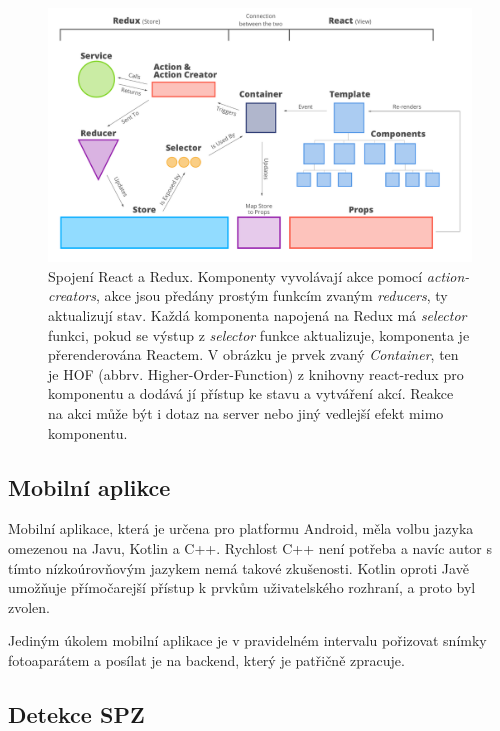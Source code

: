 \begin{figure}[!htb] \centering
\includegraphics[width=145mm]{../img/react-redux-architecture.png}
\caption[Spojení React a Redux.]{Spojení React a Redux. \citep[][]{react_redux_dataflow}
Komponenty vyvolávají akce pomocí \textit{action-creators}, akce jsou předány prostým funkcím zvaným \textit{reducers},
ty aktualizují stav. Každá komponenta napojená
na Redux má \textit{selector} funkci, pokud se výstup z \textit{selector} funkce aktualizuje, komponenta je přerenderována Reactem.
V obrázku je prvek zvaný \textit{Container}, ten je HOF (abbrv. Higher-Order-Function) z knihovny react-redux
pro komponentu a dodává jí přístup ke stavu a vytváření akcí.
Reakce na akci může být i dotaz na server nebo jiný vedlejší efekt mimo komponentu.}
\label{fig:react_redux_dataflow}
\end{figure}

\subsection{Mobilní aplikce} \label{mobile_app}

\noindent
Mobilní aplikace, která je určena pro platformu Android, měla volbu jazyka omezenou na Javu, Kotlin a C++.
Rychlost C++ není potřeba a navíc autor s tímto nízkoúrovňovým jazykem nemá takové zkušenosti.
Kotlin oproti Javě umožňuje přímočarejší přístup k prvkům uživatelského rozhraní, a proto byl zvolen.

Jediným úkolem mobilní aplikace je v pravidelném intervalu pořizovat snímky fotoaparátem a posílat je na
backend, který je patřičně zpracuje.

\subsection{Detekce SPZ}

